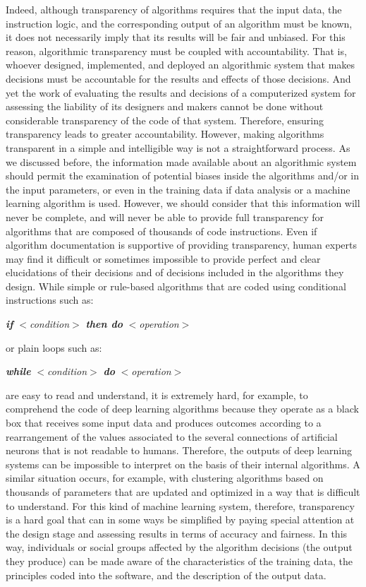 Indeed, although transparency of algorithms requires that the input data, the instruction logic, and the corresponding output of an algorithm must be known, it does not necessarily imply that its results will be fair and unbiased. For this reason, algorithmic transparency must be coupled with accountability. That is, whoever designed, implemented, and deployed an algorithmic system that makes decisions must be accountable for the results and effects of those decisions. And yet the work of evaluating the results and decisions of a computerized system for assessing the liability of its designers and makers cannot be done without considerable transparency of the code of that system. Therefore, ensuring transparency leads to greater accountability. However, making algorithms transparent in a \hbox{simple} and intelligible way is not a straightforward process. As we discussed before, the information made available about an algorithmic system should permit the examination of potential biases inside the algorithms and/or in the input parameters, or even in the training data if data analysis or a machine learning algorithm is used. However, we should consider that this information will never be complete, and will never be able to provide full transparency for algorithms that are composed of thousands of code instructions. Even if algorithm documentation is supportive of providing transparency, human experts may find it difficult or sometimes impossible to provide perfect and clear elucidations of their decisions and of decisions included in the algorithms they design. While simple or rule-based algorithms that are coded using conditional instructions such as:
\begin{center}
\textbf{\textit{if}} $<$\textit{condition}$>$ \textbf{\textit{then do}} $<$\textit{operation}$>$
\end{center}
or plain loops such as:
\begin{center}
\textbf{\textit{while}} $<$\textit{condition}$>$ \textbf{\textit{do}} $<$\textit{operation}$>$
\end{center}
are easy to read and understand, it is extremely hard, for example, to comprehend the code of deep learning algorithms because they operate as a black box that receives some input data and produces outcomes according to a rearrangement of the values associated to the several connections of artificial neurons that is not readable to humans. Therefore, the outputs of deep learning systems can be impossible to interpret on the basis of their internal algorithms. A similar situation occurs, for example, with clustering algorithms based on thousands of parameters that are updated and optimized in a way that is difficult to understand. For this kind of machine learning system, therefore, transparency is a hard goal that can in some ways be simplified by paying special attention at the design stage and assessing results in terms of accuracy and fairness. In this way, individuals or social groups affected by the algorithm decisions (the output they produce) can be made aware of the characteristics of the training data, the principles coded into the software, and the description of the output data.

